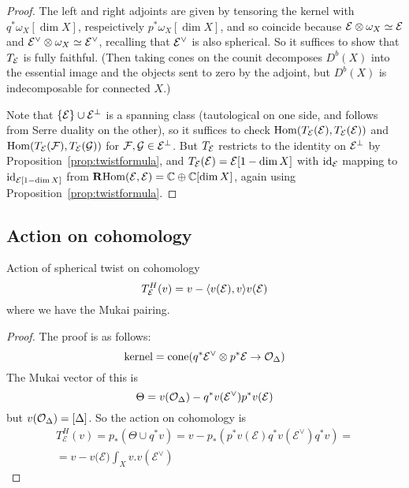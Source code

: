 \begin{proof}
    The left and right adjoints are given by tensoring the kernel with
    $q^*\omega_X[\dim X]$, respeictively $p^*\omega_X[\dim X]$, and so coincide
    because $\mathcal{E}\otimes\omega_X\simeq\mathcal{E}$ and
    $\mathcal{E}^\vee\otimes\omega_X\simeq\mathcal{E}^\vee$, recalling that $\mathcal{E}^\vee$ is
    also spherical. So it suffices to show that $T_{\mathcal{E}}$ is fully faithful.
    (Then taking cones on the counit decomposes $D^b(X)$ into the essential
    image and the objects sent to zero by the adjoint, but $D^b(X)$ is
    indecomposable for connected $X$.)

    Note that $\{\mathcal{E}\}\cup\mathcal{E}^\perp$ is a spanning class (tautological on
    one side, and follows from Serre duality on the other), so it suffices to
    check $\operatorname{Hom}(T_{\mathcal{E}}(\mathcal{E}),T_{\mathcal{E}}(\mathcal{E}))$ and
    $\operatorname{Hom}(T_{\mathcal{E}}(\mathcal{F}),T_{\mathcal{E}}(\mathcal{G}))$ for $\mathcal{F},\mathcal{G}\in \mathcal{E}^\perp$. But
    $T_{\mathcal{E}}$ restricts to the identity on $\mathcal{E}^\perp$ by
    Proposition~\ref{prop:twistformula}, and $T_{\mathcal{E}}(\mathcal{E})=\mathcal{E}[1-\dim X]$
    with $\mathrm{id}_{\mathcal{E}}$ mapping to $\mathrm{id}_{\mathcal{E}[1-\dim X]}$ from
    $\operatorname{\mathbf{R} Hom}(\mathcal{E},\mathcal{E})=\mathbb{C}\oplus\mathbb{C}[\dim X]$, again using
    Proposition~\ref{prop:twistformula}.
\end{proof}

\subsection{Action on cohomology}

\begin{proposition}{Action of spherical twist on cohomology}{}
    \begin{equation*}
        T_{\mathcal{E}}^H(v) = v-\langle v(\mathcal{E}),v\rangle v(\mathcal{E})
    \end{equation*}
    where we have the Mukai pairing.
\end{proposition}

\begin{proof}
The proof is as follows:
\begin{equation*}
    \text{kernel} = \operatorname{cone}(q^*\mathcal{E}^\lor\otimes p^* \mathcal{E}\to\mathcal{O}_{\Delta})
\end{equation*}
The Mukai vector of this is
\begin{equation*}
    \Theta = v(\mathcal{O}_{\Delta})-q^*v(\mathcal{E}^\lor)p^*v(\mathcal{E})
\end{equation*}
but $v(\mathcal{O}_{\Delta})=[\Delta]$. So the action on cohomology is
\begin{gather*}
    T_{\mathcal{E}}^H(v)
        = p_{*}(\Theta \cup q^*v)
        = v-p_{*}(p^*v(\mathcal{E})q^*v(\mathcal{E}^\lor)q^* v) = \\
        = v-v(\mathcal{E)}\int _{X} v.v(\mathcal{E}^\lor)
\end{gather*}
\end{proof}
